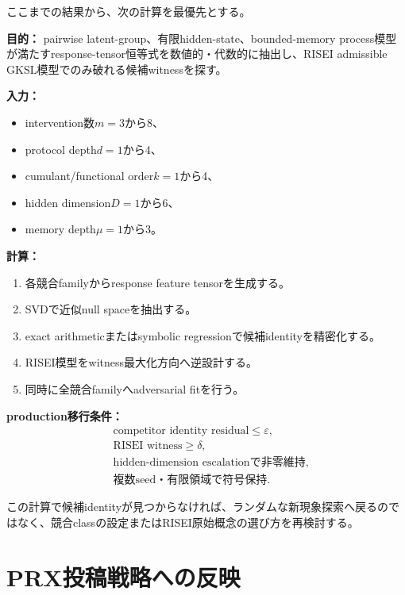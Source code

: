 \documentclass[11pt,a4paper,uplatex,dvipdfmx]{bxjsarticle}
\theoremstyle{remark}
\newcommand{\eps}{\varepsilon}
\begin{document}
ここまでの結果から、次の計算を最優先とする。

\begin{decisionbox}
\textbf{目的：} pairwise latent-group、有限hidden-state、bounded-memory process模型が満たすresponse-tensor恒等式を数値的・代数的に抽出し、RISEI admissible GKSL模型でのみ破れる候補witnessを探す。

\textbf{入力：}
\begin{itemize}
  \item intervention数$m=3$から8、
  \item protocol depth$d=1$から4、
  \item cumulant/functional order$k=1$から4、
  \item hidden dimension$D=1$から6、
  \item memory depth$\mu=1$から3。
\end{itemize}

\textbf{計算：}
\begin{enumerate}
  \item 各競合familyからresponse feature tensorを生成する。
  \item SVDで近似null spaceを抽出する。
  \item exact arithmeticまたはsymbolic regressionで候補identityを精密化する。
  \item RISEI模型をwitness最大化方向へ逆設計する。
  \item 同時に全競合familyへadversarial fitを行う。
\end{enumerate}

\textbf{production移行条件：}
\begin{equation}
\boxed{
\begin{aligned}
&\text{competitor identity residual}\le\eps,\\
&\text{RISEI witness}\ge\delta,\\
&\text{hidden-dimension escalationで非零維持},\\
&\text{複数seed・有限領域で符号保持}.
\end{aligned}}
\end{equation}
\end{decisionbox}

この計算で候補identityが見つからなければ、ランダムな新現象探索へ戻るのではなく、競合classの設定またはRISEI原始概念の選び方を再検討する。

\section{PRX投稿戦略への反映}
\end{document}
